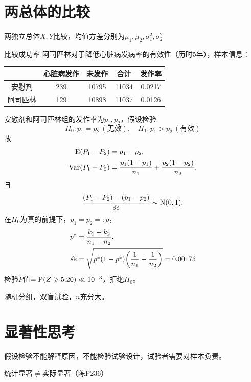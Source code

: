 \section{两总体的比较}
两独立总体$X,Y$比较，均值方差分别为$\mu_1,\mu_2,\sigma_1^2,\sigma_2^2$

\begin{example}{比较成功率}{}
	阿司匹林对于降低心脏病发病率的有效性（历时5年），样本信息：
	\begin{notecaptionblock}
		\begin{tabular}{c|cccc}
			\toprule
			&心脏病发作&未发作&合计&发作率\\
			\midrule
			安慰剂&239&10795&11034&0.0217\\
			阿司匹林&129&10898&11037&0.0126\\
			\bottomrule
		\end{tabular}
	\end{notecaptionblock}
	安慰剂和阿司匹林组的发作率为$p_1,p_2$，假设检验 
	\[
		H_0:p_1 = p_2\,(\text{无效}),\quad H_1:p_1 > p_2\,(\text{有效})
	\]
	故
	\begin{align*}
		\E(P_1 - P_2) &= p_1 - p_2,\\
		\Var(P_1 - P_2) &= \frac{p_1(1 - p_1)}{n_1} + \frac{p_2(1 - p_2)}{n_2}.
	\end{align*}
	且
	\[
		\frac{(P_1 - P_2) - (p_1 - p_2)}{\hat{se}} \dotsim \NormalDist(0,1),
	\]
	在$H_0$为真的前提下，$p_1 = p_2 =: p$，
	\begin{align*}
		p^\ast &= \frac{k_1 + k_2}{n_1 + n_2},\\
		\hat{se} &= \sqrt{p^\ast(1 - p^\ast)\biggp{\frac1{n_1} + \frac1{n_2}}} = 0.00175
	\end{align*}
	检验$P$值$= \P(Z \geqslant 5.20) \ll 10^{-3}$，拒绝$H_0$。
\end{example}
\begin{remark}
	随机分组，双盲试验，$n$充分大。
\end{remark}

\section{显著性思考}
假设检验不能解释原因，不能检验试验设计，试验者需要对样本负责。

统计显著$\neq$实际显著（陈P236）
